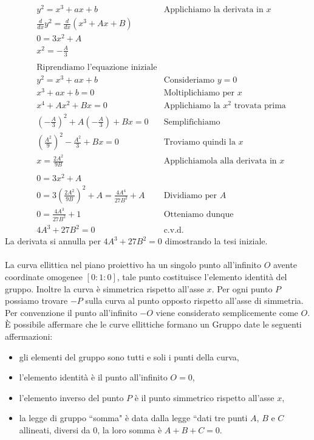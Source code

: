 \documentclass[a4paper,12pt]{tesiinfo}
\newcommand\ddfrac[2]{\frac{\displaystyle #1}{\displaystyle #2}}
\begin{document}
\begin{align*}
&y^2 = x^3 + ax+b &\text{Applichiamo la derivata in $x$}\\
&\ddfrac{d}{dx}y^2 = \ddfrac{d}{dx}(x^3 +Ax+B)\\
&0 = 3x^2 +A\\
&x^2 = -\ddfrac{A}{3}\\
\\
&\text{Riprendiamo l'equazione iniziale}\\
&y^2 = x^3 + ax+b &\text{Consideriamo $y=0$}\\
&x^3 + ax+b = 0 &\text{Moltiplichiamo per $x$}\\
&x^4 + Ax^2+Bx = 0 &\text{Applichiamo la $x^2$ trovata prima}\\
& \left (-\ddfrac{A}{3} \right )^2 + A \left (-\ddfrac{A}{3}\right )+Bx = 0 &\text{Semplifichiamo}\\
&\left (\ddfrac{A^2}{9} \right )^2 - \ddfrac{A^2}{3}+Bx = 0 &\text{Troviamo quindi la $x$}\\
&x = \ddfrac{2A^2}{9B}
&\text{Applichiamola alla derivata in $x$}\\
\\
&0 = 3x^2 +A\\
&0 = 3 \left (\ddfrac{2A^2}{9B} \right )^2 +A = \ddfrac{4A^4}{27B^2} +A &\text{Dividiamo per $A$}\\
&0 = \ddfrac{4A^3}{27B^2} +1 &\text{Otteniamo dunque}\\
&4A^3+27B^2 = 0 &\text{c.v.d.}
\end{align*}
La derivata si annulla per $4A^3+27B^2 = 0$ dimostrando la tesi iniziale.\\
\\
La curva ellittica nel piano proiettivo ha un singolo punto all'infinito $O$ avente coordinate omogenee $[0:1:0]$, tale punto costituisce l'elemento identit\`a del gruppo. Inoltre la curva \`e simmetrica rispetto all'asse $x$. Per ogni punto $P$ possiamo trovare $-P$ sulla curva al punto opposto rispetto all'asse di simmetria. Per convenzione il punto all'infinito $-O$ viene considerato semplicemente come $O$.\\
\`E possibile affermare che le curve ellittiche formano un Gruppo date le seguenti affermazioni:
\begin{itemize}
 \item gli elementi del gruppo sono tutti e soli i punti della curva,
 \item l'elemento identit\`a \`e il punto all'infinito $O = 0$,
 \item l'elemento inverso del punto $P$ \`e il punto simmetrico rispetto all'asse $x$,
 \item la legge di gruppo ``somma" \`e data dalla legge ``dati tre punti $A$, $B$ e $C$ allineati, diversi da $0$, la loro somma \`e $A+B+C=0$.
\end{itemize}
\end{document}
